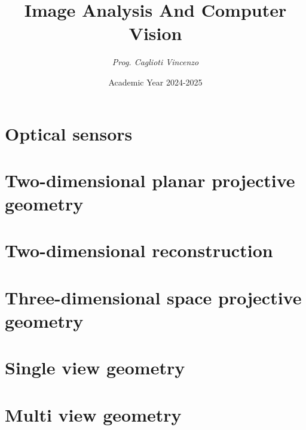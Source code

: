 \documentclass[12pt, a4paper]{report}
\title{\textbf{Image Analysis And Computer Vision}}
\author{\textit{Prog. Caglioti Vincenzo}}
\date{Academic Year 2024-2025}
\begin{document}
    \maketitle

    

    \cleardoublepage

    \tableofcontents

    \cleardoublepage

    \chapter{Optical sensors}
    
      
    
    
    
    
    

    \chapter{Two-dimensional planar projective geometry}
    
    
    
    
    
    

    \chapter{Two-dimensional reconstruction}
    
    
    
    

    \chapter{Three-dimensional space projective geometry}
    
    
    
    
    
    

    \chapter{Single view geometry}
    
    
    
    
    

    \chapter{Multi view geometry}
    
    
    
\end{document}
